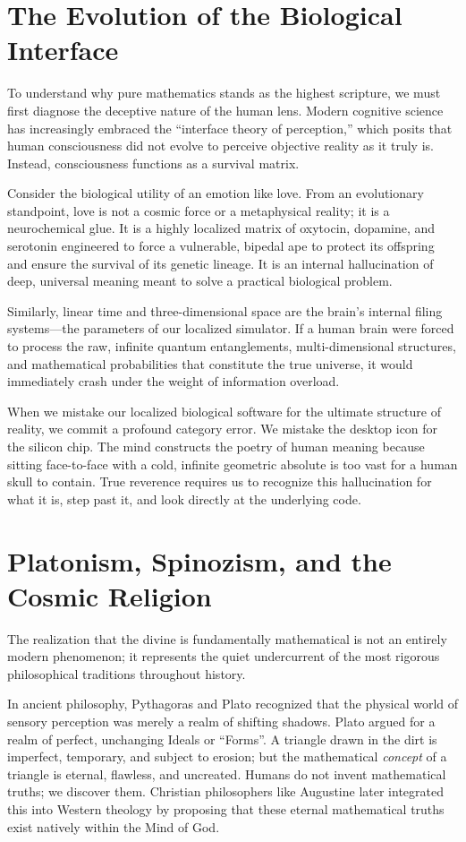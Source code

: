 \documentclass[12pt]{article}
\begin{document}
\section{The Evolution of the Biological Interface}
To understand why pure mathematics stands as the highest scripture, we must first diagnose the deceptive nature of the human lens. Modern cognitive science has increasingly embraced the ``interface theory of perception,'' which posits that human consciousness did not evolve to perceive objective reality as it truly is. Instead, consciousness functions as a survival matrix. 

Consider the biological utility of an emotion like love. From an evolutionary standpoint, love is not a cosmic force or a metaphysical reality; it is a neurochemical glue. It is a highly localized matrix of oxytocin, dopamine, and serotonin engineered to force a vulnerable, bipedal ape to protect its offspring and ensure the survival of its genetic lineage. It is an internal hallucination of deep, universal meaning meant to solve a practical biological problem. 

Similarly, linear time and three-dimensional space are the brain's internal filing systems—the parameters of our localized simulator. If a human brain were forced to process the raw, infinite quantum entanglements, multi-dimensional structures, and mathematical probabilities that constitute the true universe, it would immediately crash under the weight of information overload. 

When we mistake our localized biological software for the ultimate structure of reality, we commit a profound category error. We mistake the desktop icon for the silicon chip. The mind constructs the poetry of human meaning because sitting face-to-face with a cold, infinite geometric absolute is too vast for a human skull to contain. True reverence requires us to recognize this hallucination for what it is, step past it, and look directly at the underlying code.

\section{Platonism, Spinozism, and the Cosmic Religion}
The realization that the divine is fundamentally mathematical is not an entirely modern phenomenon; it represents the quiet undercurrent of the most rigorous philosophical traditions throughout history. 

In ancient philosophy, Pythagoras and Plato recognized that the physical world of sensory perception was merely a realm of shifting shadows. Plato argued for a realm of perfect, unchanging Ideals or ``Forms''. A triangle drawn in the dirt is imperfect, temporary, and subject to erosion; but the mathematical \textit{concept} of a triangle is eternal, flawless, and uncreated. Humans do not invent mathematical truths; we discover them. Christian philosophers like Augustine later integrated this into Western theology by proposing that these eternal mathematical truths exist natively within the Mind of God. 
\end{document}
